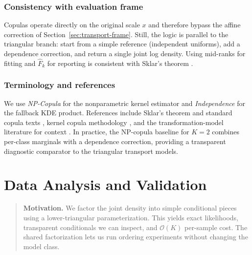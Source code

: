 \documentclass[11pt,a4paper,twoside]{book}\usepackage[]{graphicx}\usepackage[]{xcolor}
\begin{document}
\subsection{Consistency with evaluation frame}

Copulas operate directly on the original scale $x$ and therefore bypass the affine correction of Section~\ref{sec:transport-frame}. Still, the logic is parallel to the triangular branch: start from a simple reference (independent uniforms), add a dependence correction, and return a single joint log density. Using mid-ranks for fitting and $\widehat F_k$ for reporting is consistent with Sklar's theorem \citep{sklar1959fonctions,nelsen2006introduction,joe2014dependence}.

\subsection{Terminology and references}

We use \textit{NP-Copula} for the nonparametric kernel estimator and \textit{Independence} for the fallback KDE product. References include Sklar’s theorem and standard copula texts \citep{sklar1959fonctions,nelsen2006introduction,joe2014dependence}, kernel copula methodology \citep{nagler2017kdecopula}, and the transformation-model literature for context \citep{hothorn2021transformation}. In practice, the NP-copula baseline for $K=2$ combines per-class marginals with a dependence correction, providing a transparent diagnostic comparator to the triangular transport models.





\chapter{Data Analysis and Validation}\label{ch:dataanalysis}

\begin{quote}
\textbf{Motivation.} We factor the joint density into simple conditional pieces using a lower-triangular parameterization. This yields exact likelihoods, transparent conditionals we can inspect, and $\mathcal{O}(K)$ per-sample cost. The shared factorization lets us run ordering experiments without changing the model class.
\end{quote}
\end{document}
